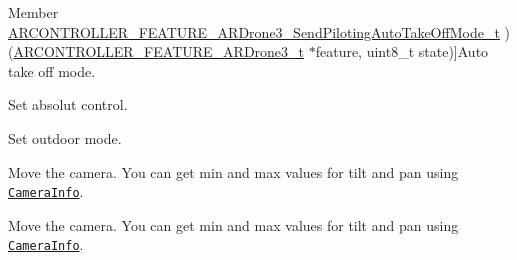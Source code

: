 \begin{DoxyRefList}
\hypertarget{deprecated__deprecated000055}{}%
Member \hyperlink{_a_r_c_o_n_t_r_o_l_l_e_r___feature_8h_a1f8bb6db72d60e504cf2108030dd22f8}{A\+R\+C\+O\+N\+T\+R\+O\+L\+L\+E\+R\+\_\+\+F\+E\+A\+T\+U\+R\+E\+\_\+\+A\+R\+Drone3\+\_\+\+Send\+Piloting\+Auto\+Take\+Off\+Mode\+\_\+t} )(\hyperlink{struct_a_r_c_o_n_t_r_o_l_l_e_r___f_e_a_t_u_r_e___a_r_drone3__t}{A\+R\+C\+O\+N\+T\+R\+O\+L\+L\+E\+R\+\_\+\+F\+E\+A\+T\+U\+R\+E\+\_\+\+A\+R\+Drone3\+\_\+t} $\ast$feature, uint8\+\_\+t state)]Auto take off mode.  
\item[\label{deprecated__deprecated000063}%
\hypertarget{deprecated__deprecated000063}{}%
Member \hyperlink{_a_r_c_o_n_t_r_o_l_l_e_r___feature_8h_a3829cd47c0cb024cb0be7ec66aff5953}{A\+R\+C\+O\+N\+T\+R\+O\+L\+L\+E\+R\+\_\+\+F\+E\+A\+T\+U\+R\+E\+\_\+\+A\+R\+Drone3\+\_\+\+Send\+Piloting\+Settings\+Absolut\+Control\+\_\+t} )(\hyperlink{struct_a_r_c_o_n_t_r_o_l_l_e_r___f_e_a_t_u_r_e___a_r_drone3__t}{A\+R\+C\+O\+N\+T\+R\+O\+L\+L\+E\+R\+\_\+\+F\+E\+A\+T\+U\+R\+E\+\_\+\+A\+R\+Drone3\+\_\+t} $\ast$feature, uint8\+\_\+t on)]Set absolut control.  
\item[\label{deprecated__deprecated000064}%
\hypertarget{deprecated__deprecated000064}{}%
Member \hyperlink{_a_r_c_o_n_t_r_o_l_l_e_r___feature_8h_a99daf53e870754d115174657cbe2129f}{A\+R\+C\+O\+N\+T\+R\+O\+L\+L\+E\+R\+\_\+\+F\+E\+A\+T\+U\+R\+E\+\_\+\+A\+R\+Drone3\+\_\+\+Send\+Speed\+Settings\+Outdoor\+\_\+t} )(\hyperlink{struct_a_r_c_o_n_t_r_o_l_l_e_r___f_e_a_t_u_r_e___a_r_drone3__t}{A\+R\+C\+O\+N\+T\+R\+O\+L\+L\+E\+R\+\_\+\+F\+E\+A\+T\+U\+R\+E\+\_\+\+A\+R\+Drone3\+\_\+t} $\ast$feature, uint8\+\_\+t outdoor)]Set outdoor mode.  
\item[\label{deprecated__deprecated000057}%
\hypertarget{deprecated__deprecated000057}{}%
Member \hyperlink{_a_r_c_o_n_t_r_o_l_l_e_r___feature_8h_a36213dfc1bb5a2ec07f74820ad5d4b25}{A\+R\+C\+O\+N\+T\+R\+O\+L\+L\+E\+R\+\_\+\+F\+E\+A\+T\+U\+R\+E\+\_\+\+A\+R\+Drone3\+\_\+\+Set\+Camera\+Orientation\+\_\+t} )(\hyperlink{struct_a_r_c_o_n_t_r_o_l_l_e_r___f_e_a_t_u_r_e___a_r_drone3__t}{A\+R\+C\+O\+N\+T\+R\+O\+L\+L\+E\+R\+\_\+\+F\+E\+A\+T\+U\+R\+E\+\_\+\+A\+R\+Drone3\+\_\+t} $\ast$feature, int8\+\_\+t tilt, int8\+\_\+t pan)]Move the camera. You can get min and max values for tilt and pan using \href{#0-15-0}{\tt Camera\+Info}.  
\item[\label{deprecated__deprecated000060}%
\hypertarget{deprecated__deprecated000060}{}%
Member \hyperlink{_a_r_c_o_n_t_r_o_l_l_e_r___feature_8h_abeb5811c13cc31409258e5a9f9a286e8}{A\+R\+C\+O\+N\+T\+R\+O\+L\+L\+E\+R\+\_\+\+F\+E\+A\+T\+U\+R\+E\+\_\+\+A\+R\+Drone3\+\_\+\+Set\+Camera\+Orientation\+Pan\+\_\+t} )(\hyperlink{struct_a_r_c_o_n_t_r_o_l_l_e_r___f_e_a_t_u_r_e___a_r_drone3__t}{A\+R\+C\+O\+N\+T\+R\+O\+L\+L\+E\+R\+\_\+\+F\+E\+A\+T\+U\+R\+E\+\_\+\+A\+R\+Drone3\+\_\+t} $\ast$feature, int8\+\_\+t pan)]Move the camera. You can get min and max values for tilt and pan using \href{#0-15-0}{\tt Camera\+Info}.  

\end{DoxyRefList}
